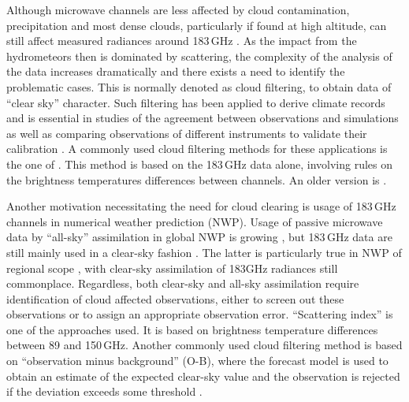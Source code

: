 \documentclass[amt, manuscript]{copernicus}
\begin{document}
Although microwave channels are less affected by cloud contamination, precipitation and most dense clouds, particularly if found at high altitude, can
still affect measured radiances around 183\,GHz
\citep[e.g.][]{bennartz2003sensitivity}. As the impact from the hydrometeors
then is dominated by scattering, the complexity of the analysis of the data
increases dramatically and there exists a need to identify the problematic
cases. This is normally denoted as cloud filtering, to obtain data of ``clear
sky'' character. Such filtering has been applied to derive climate records
\citep{lang2020new} and is essential in studies of the agreement between
observations and simulations \citep{brogniez2016review} as well as 
comparing observations of different instruments to validate their calibration
\citep{john2013assessment,moradi:retri:15,berg2016intercalibration}. A commonly
used cloud filtering methods for these applications is the one of
\citet{buehler:aclou:07}. This method is based on the 183\,GHz data alone,
involving rules on the brightness temperatures differences between channels. An
older version is \citet{burns1997effects}. 

Another motivation necessitating the need for cloud clearing is usage of 183\,GHz channels in 
numerical weather prediction (NWP). Usage of passive microwave data by
``all-sky'' assimilation in global NWP is growing \citep{geer2017growing},
but 183\,GHz data are still mainly used in a clear-sky fashion
\citep{geer2018all}. The latter is particularly true in NWP of regional scope
\citep{gustafsson2018survey}, with clear-sky assimilation of 183GHz radiances still commonplace. Regardless, both clear-sky and all-sky assimilation require identification of cloud affected observations, either to screen out these observations or to assign an appropriate observation error. ``Scattering index'' \citep{geer2015scatteringindex} is one of the approaches used. It is based on brightness temperature differences between 89 and 150\,GHz. Another commonly used cloud filtering method is based on ``observation minus background'' (O-B), where the forecast model is used to obtain an estimate of the expected clear-sky value and the observation is rejected if the deviation exceeds some threshold \citep{English1999clouddetection}. 
\end{document}
